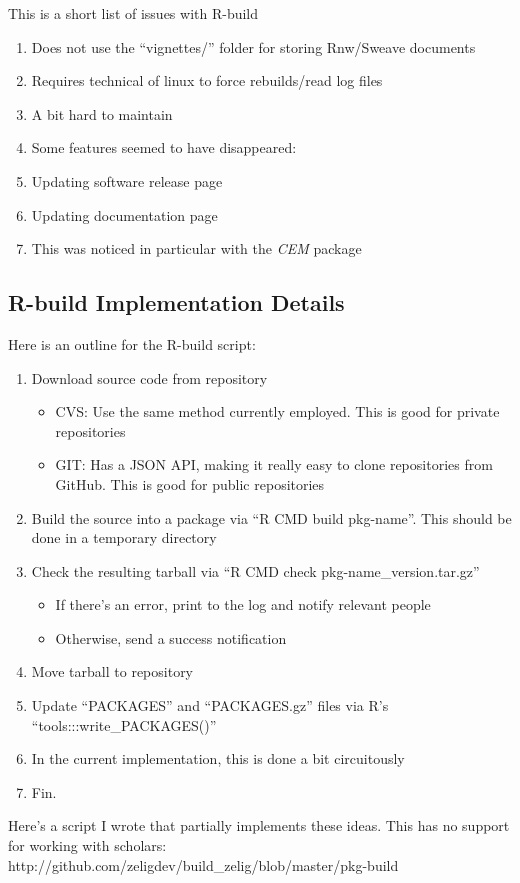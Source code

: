 \documentclass{article}
\begin{document}
This is a short list of issues with R-build

\begin{enumerate}
\item
  Does not use the ``vignettes/'' folder for storing Rnw/Sweave
  documents
\item
  Requires technical of linux to force rebuilds/read log files
\item
  A bit hard to maintain
\item
  Some features seemed to have disappeared:
\item
  Updating software release page
\item
  Updating documentation page
\item
  This was noticed in particular with the \emph{CEM} package
\end{enumerate}
\subsection{R-build Implementation Details}

Here is an outline for the R-build script:

\begin{enumerate}
\item
  Download source code from repository
  \begin{itemize}
    \item
      CVS: Use the same method currently employed. This is good for private
      repositories
    \item
      GIT: Has a JSON API, making it really easy to clone repositories from
      GitHub. This is good for public repositories
  \end{itemize}
\item
  Build the source into a package via ``R CMD build pkg-name''. This
  should be done in a temporary directory
\item
  Check the resulting tarball via ``R CMD check
  pkg-name\_version.tar.gz''
  \begin{itemize}
    \item
      If there's an error, print to the log and notify relevant people
    \item
      Otherwise, send a success notification
  \end{itemize}
\item
  Move tarball to repository
\item
  Update ``PACKAGES'' and ``PACKAGES.gz'' files via R's
  ``tools:::write\_PACKAGES()''
\item
  In the current implementation, this is done a bit circuitously
\item
  Fin.
\end{enumerate}
Here's a script I wrote that partially implements these ideas. This has
no support for working with scholars:
http://github.com/zeligdev/build\_zelig/blob/master/pkg-build
\end{document}
